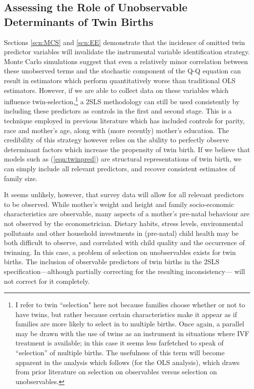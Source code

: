 \documentclass{article}[11pt,subeqn]
\begin{document}
\begin{spacing}{1.5}
\subsection{Assessing the Role of Unobservable Determinants of Twin Births}
\label{scn:selection}
Sections \ref{scn:MCS} and \ref{scn:EE} demonstrate that the incidence of omitted twin predictor variables will invalidate the instrumental variable identification strategy.  
Monte Carlo simulations suggest that even a relatively minor correlation between these unobserved terms and the stochastic component of the Q-Q equation can result in estimators 
which perform quantitatively worse than traditional OLS estimators.  However, if we are able to collect data on these variables which influence twin-selection,\footnote{I refer to twin ``selection" 
here not because families choose whether or not to have twins, but rather because certain characteristics make it appear as if families are more likely to select in to multiple 
births.  Once again, a parallel may be drawn with the use of twins as an instrument in situations where IVF treatment is available; in this case it seems less farfetched to speak 
of ``selection'' of multiple births.  The usefulness of this term will become apparent in the analysis which follows (for the OLS analysis), which draws from prior literature on 
selection on observables versus selection on unobservables.} a 2SLS methodology can still be used consistently by including these predictors as controls in the first and second 
stage.  This is a technique employed in previous literature which has included controls for parity, race and mother's age, along with (more recently) mother's education.  The 
credibility of this strategy however relies on the ability to perfectly observe determinant factors which increase the propensity of twin birth.  If we believe that models such 
as (\ref{eqn:twinpred}) are structural representations of twin birth, we can simply include all relevant predictors, and recover consistent estimates of family size.

It seems unlikely, however, that survey data will allow for all relevant predictors to be observed.  While mother's weight and height and family socio-economic characteristics 
are observable, many aspects of a mother's pre-natal behaviour are not observed by the econometrician.  Dietary habits, stress levels, environmental pollutants and other household 
investments in (pre-natal) child health 
may be both difficult to observe, and correlated with child quality and the occurrence of twinning.  In this case, a problem of selection on unobservables exists for twin births.  The 
inclusion of observable predictors of twin births in the 2SLS specification---although partially correcting for the resulting inconsistency--- will not correct for it completely.


\end{spacing}
\end{document}
